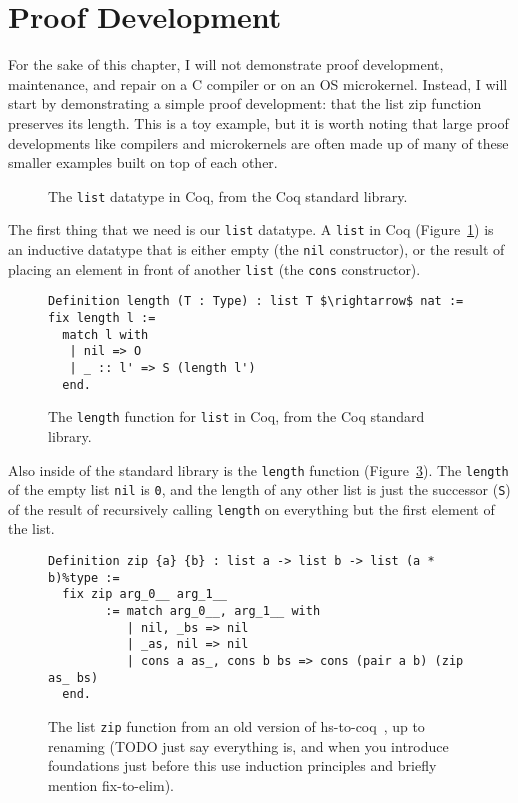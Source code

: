 \section{Proof Development}
\label{sec:mot-dev}

For the sake of this chapter, I will not demonstrate proof development, maintenance, and repair on a C compiler or on an OS microkernel.
Instead, I will start by demonstrating a simple proof development: 
that the list zip function preserves its length.
This is a toy example, but it is worth noting that large proof developments like compilers and microkernels
are often made up of many of these smaller examples built on top of each other.

\begin{figure}
   
\caption{The \lstinline{list} datatype in Coq, from the Coq standard library.}
\label{fig:list}
\end{figure}

The first thing that we need is our \lstinline{list} datatype.
A \lstinline{list} in Coq (Figure~\ref{fig:list}) is an inductive datatype that is either empty (the \lstinline{nil} constructor), or the result
of placing an element in front of another \lstinline{list} (the \lstinline{cons} constructor).

\begin{figure}
\begin{lstlisting}
Definition length (T : Type) : list T $\rightarrow$ nat := fix length l :=
  match l with
   | nil => O
   | _ :: l' => S (length l')
  end.
\end{lstlisting}
\caption{The \lstinline{length} function for \lstinline{list} in Coq, from the Coq standard library.}
\label{fig:length}
\end{figure}

Also inside of the standard library is the \lstinline{length} function (Figure~\ref{fig:length}).
The \lstinline{length} of the empty list \lstinline{nil} is \lstinline{0}, and the length of any other list
is just the successor (\lstinline{S}) of the result of recursively calling \lstinline{length} on everything but the first element of the list.	

\begin{figure}
\begin{lstlisting}
Definition zip {a} {b} : list a -> list b -> list (a * b)%type :=
  fix zip arg_0__ arg_1__
        := match arg_0__, arg_1__ with
           | nil, _bs => nil
           | _as, nil => nil
           | cons a as_, cons b bs => cons (pair a b) (zip as_ bs)
  end.
\end{lstlisting}
\caption{The list \lstinline{zip} function from an old version of hs-to-coq~\cite{TODO}, up to renaming (TODO just say everything is, and when you introduce foundations just before this use induction principles and briefly mention fix-to-elim).}
\label{fig:length}
\end{figure}

